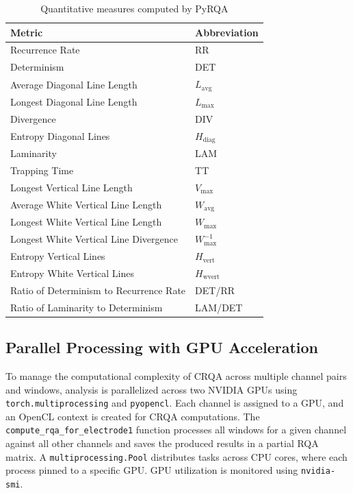 \documentclass{article}
\begin{document}
				\begin{table}[h]
				\centering
				\caption{Quantitative measures computed by PyRQA}
				\label{tab:pyrqa_metrics}
				\begin{tabular}{ll}
				\toprule
				\textbf{Metric} & \textbf{Abbreviation} \\
				\midrule
				Recurrence Rate & RR \\
				Determinism & DET \\
				Average Diagonal Line Length & \(L_{\text{avg}}\) \\
				Longest Diagonal Line Length & \(L_{\text{max}}\) \\
				Divergence & DIV \\
				Entropy Diagonal Lines & \(H_{\text{diag}}\) \\
				Laminarity & LAM \\
				Trapping Time & TT \\
				Longest Vertical Line Length & \(V_{\text{max}}\) \\
				Average White Vertical Line Length & \(W_{\text{avg}}\) \\
				Longest White Vertical Line Length & \(W_{\text{max}}\) \\
				Longest White Vertical Line Divergence & \(W_{\text{max}}^{-1}\) \\
				Entropy Vertical Lines & \(H_{\text{vert}}\) \\
				Entropy White Vertical Lines & \(H_{\text{wvert}}\) \\
				Ratio of Determinism to Recurrence Rate & DET/RR \\
				Ratio of Laminarity to Determinism & LAM/DET \\
				\bottomrule
				\end{tabular}
				\end{table}

				\subsection{Parallel Processing with GPU Acceleration}
				\label{subsec:parallel_processing}

				To manage the computational complexity of CRQA across multiple channel pairs and windows, 
				analysis is parallelized across two NVIDIA GPUs using \texttt{torch.multiprocessing} and \texttt{pyopencl}. 
				Each channel is assigned to a GPU, and an OpenCL context is created for CRQA computations. 
				The \texttt{compute\_rqa\_for\_electrode1} function processes all windows for a 
				given channel against all other channels and saves the produced results in a partial RQA matrix. 
				A \texttt{multiprocessing.Pool} distributes tasks across CPU cores, where each process pinned to a specific GPU. GPU utilization is monitored using \texttt{nvidia-smi}.
\end{document}
